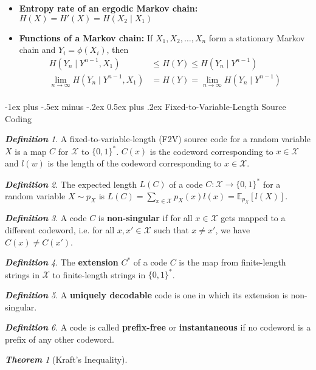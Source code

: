 \documentclass[frenchspacing,9pt,landscape,a4paper]{article}
\makeatletter
\renewcommand{\section}{\@startsection{section}{1}{0mm}%
                                {-1ex plus -.5ex minus -.2ex}%
                                {0.5ex plus .2ex}%
                                {\normalfont\large\bfseries}}
\theoremstyle{remark}
\newtheorem*{thm}{\textbf{Theorem}}
\newtheorem*{defn}{\textbf{Definition}}
\makeatother
\begin{document}
\begin{multicols}{4}
\begin{itemize}
    \item \textbf{Entropy rate of an ergodic Markov chain:} $H(X)=H'(X)=H(X_2\mid X_1)$ 
    \item \textbf{Functions of a Markov chain:} If  $X_1,X_2,\dots,X_n$ form a stationary Markov chain and
        $Y_i=\phi(X_i)$, then
        \begin{align*}
            H(Y_n\mid Y^{n-1},X_1)&\leq H(Y)\leq H(Y_n\mid Y^{n-1})\\
            \lim_{n\to\infty}H(Y_n\mid Y^{n-1},X_1)&=H(Y)=\lim_{n\to\infty}H(Y_n\mid Y^{n-1})\\
        \end{align*}
\end{itemize}
\section{Fixed-to-Variable-Length Source Coding}
\begin{defn}
    A fixed-to-variable-length (F2V) source code for a random variable $X$ is a map  $C$ for  $\mathcal{X}$
    to  $\{0,1\}^*$.  $C(x)$ is the codeword corresponding to  $x\in\mathcal{X}$ and  $l(w)$ is the length
    of the codeword corresponding to  $x\in\mathcal{X}$.
\end{defn}
\begin{defn}
    The expected length $L(C)$ of a code  $C:\mathcal{X}\to\{0,1\}^*$ for a random variable  $X\sim p_X$ is
    $L(C)=\sum_{x\in\mathcal{X}}p_X(x)l(x)=\mathbb{E}_{p_X}[l(X)]$.
\end{defn}
\begin{defn}
    A code $C$ is \textbf{non-singular} if for all  $x\in\mathcal{X}$ gets mapped to a different codeword,
    i.e. for all  $x,x'\in\mathcal{X}$ such that  $x\neq x'$, we have  $C(x)\neq C(x')$.
\end{defn}
\begin{defn}
    The \textbf{extension} $C^*$ of a code  $C$ is the map from finite-length strings in $\mathcal{X}$ to
    finite-length strings in  $\{0,1\}^*$.
\end{defn}
\begin{defn}
    A \textbf{uniquely decodable} code is one in which its extension is non-singular.
\end{defn}
\begin{defn}
    A code is called \textbf{prefix-free} or \textbf{instantaneous} if no codeword is a prefix of any other
    codeword.
\end{defn}
\begin{thm}[Kraft's Inequality]

\end{thm}
\end{multicols}
\end{document}

